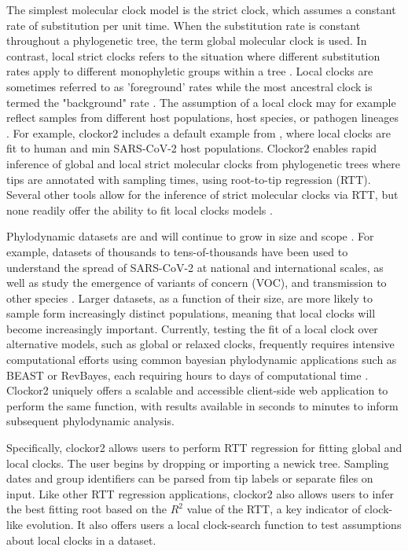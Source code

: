 \documentclass{article}
\begin{document}
The simplest molecular clock model is the strict clock, which assumes a constant rate of substitution per unit time. When the substitution rate is constant throughout a phylogenetic tree, the term global molecular clock is used. In contrast, local strict clocks refers to the situation where different substitution rates apply to different monophyletic groups within a tree \citep{ho2014molecular}. Local clocks are sometimes referred to as 'foreground' rates while the most ancestral clock is termed the "background" rate \citep{yoder2000estimation}. The assumption of a local clock may for example reflect samples from different host populations, host species, or pathogen lineages \citep{worobey_synchronized_2014}. For example, clockor2 includes a default example from \citet{porter2023evolutionary}, where local clocks are fit to human and min SARS-CoV-2 host populations. Clockor2 enables rapid inference of global and local strict molecular clocks from phylogenetic trees where tips are annotated with sampling times, using root-to-tip regression (RTT). Several other tools allow for the inference of strict molecular clocks via RTT, but none readily offer the ability to fit local clocks models \citep{rambaut_exploring_2016, hadfield_nextstrain_2018,sagulenko_treetime_2018,volz_scalable_2017}. 

Phylodynamic datasets are and will continue to grow in size and scope \cite{featherstone2022epidemiological}. For example, datasets of thousands to tens-of-thousands have been used to understand the spread of SARS-CoV-2 at national and international scales, as well as study the emergence of variants of concern (VOC), and transmission to other species \citep{du_plessis_establishment_2021,hill_origins_2022,nadeau_swiss_2023,porter2023evolutionary}. Larger datasets, as a function of their size, are more likely to sample form increasingly distinct populations, meaning that local clocks will become increasingly important. Currently, testing the fit of a local clock over alternative models, such as global or relaxed clocks, frequently requires intensive computational  efforts using common bayesian phylodynamic applications such as BEAST or RevBayes, each requiring hours to days of computational time \citep{bouckaert_beast_2019, suchard_bayesian_2018, hoehna_2016_revbayes}. Clockor2 uniquely offers a scalable and accessible client-side web application to perform the same function, with results available in seconds to minutes to inform subsequent phylodynamic analysis.

Specifically, clockor2 allows users to perform RTT regression for fitting global and local clocks. The user begins by dropping or importing a newick tree. Sampling dates and group identifiers can be parsed from tip labels or separate files on input. Like other RTT regression applications, clockor2 also allows users to infer the best fitting root based on the $R^2$ value of the RTT, a key indicator of clock-like evolution. It also offers users a local clock-search function to test assumptions about local clocks in a dataset. 
\end{document}
